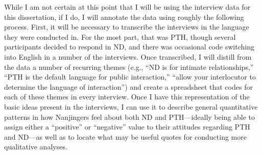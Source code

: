 While I am not certain at this point that I will be using the interview data for this dissertation, if I do, I will annotate the data using roughly the following process. First, it will be necessary to transcribe the interviews in the language they were conducted in. For the most part, that was PTH, though several participants decided to respond in ND, and there was occasional code switching into English in a number of the interviews. Once transcribed, I will distill from the data a number of recurring themes (e.g., ``ND is for intimate relationships,'' ``PTH is the default language for public interaction,'' ``allow your interlocutor to determine the language of interaction'') and create a spreadsheet that codes for each of these themes in every interview. Once I have this representation of the basic ideas present in the interviews, I can use it to describe general quantitative patterns in how Nanjingers feel about both ND and PTH---ideally being able to assign either a “positive” or “negative” value to their attitudes regarding PTH and ND---as well as to locate what may be useful quotes for conducting more qualitative analyses.



